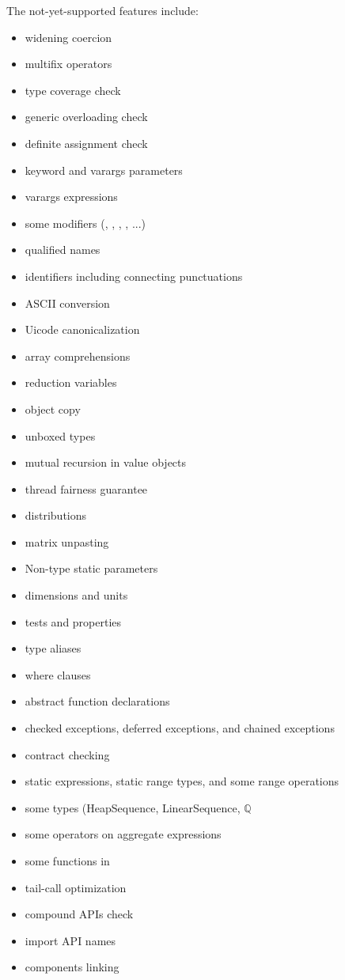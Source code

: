 \begin{figure}[p]
The not-yet-supported features include:
\begin{itemize}
\item widening coercion
\item multifix operators
\item type coverage check
\item generic overloading check
\item definite assignment check
\item keyword and varargs parameters
\item varargs expressions
\item some modifiers (, , , , ...)
\item qualified names
\item identifiers including connecting punctuations
\item ASCII conversion
\item Uicode canonicalization
\item array comprehensions
\item reduction variables
\item object copy
\item unboxed types
\item mutual recursion in value objects
\item thread fairness guarantee
\item distributions
\item matrix unpasting
\item Non-type static parameters
\item dimensions and units
\item tests and properties
\item type aliases
\item where clauses
\item abstract function declarations
\item checked exceptions, deferred exceptions, and chained exceptions
\item contract checking
\item static expressions, static range types, and some range operations
\item some types (HeapSequence, LinearSequence, $\mathbb{Q}$
\item some operators on aggregate expressions
\item some functions in 
\item tail-call optimization
\item compound APIs check
\item import API names
\item components linking
\end{itemize}
\end{figure}

